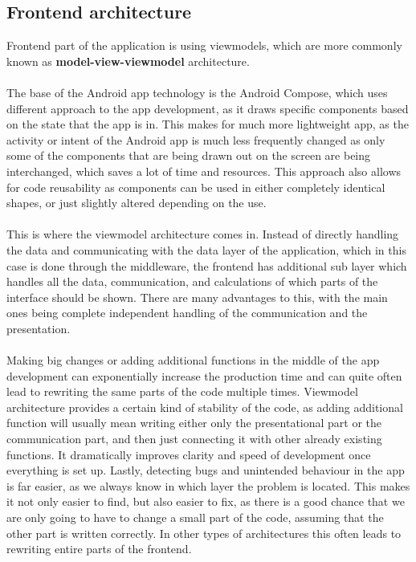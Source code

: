\subsection{Frontend architecture}
\hspace{\parindent}Frontend part of the application is using viewmodels, which are more commonly known as \textbf{model-view-viewmodel} architecture.\\ \\
The base of the Android app technology is the Android Compose, which uses different approach to the app development, as it draws specific components based on the state that the app is in. This makes for much more lightweight app, as the activity or intent of the Android app is much less frequently changed as only some of the components that are being drawn out on the screen are being interchanged, which saves a lot of time and resources. This approach also allows for code reusability as components can be used in either completely identical shapes, or just slightly altered depending on the use.\\ \\
This is where the viewmodel architecture comes in. Instead of directly handling the data and communicating with the data layer of the application, which in this case is done through the middleware, the frontend has additional sub layer which handles all the data, communication, and calculations of which parts of the interface should be shown. There are many advantages to this, with the main ones being complete independent handling of the communication and the presentation.\\ \\
Making big changes or adding additional functions in the middle of the app development can exponentially increase the production time and can quite often lead to rewriting the same parts of the code multiple times. Viewmodel architecture provides a certain kind of stability of the code, as adding additional function will usually mean writing either only the presentational part or the communication part, and then just connecting it with other already existing functions. It dramatically improves clarity and speed of development once everything is set up. Lastly, detecting bugs and unintended behaviour in the app is far easier, as we always know in which layer the problem is located. This makes it not only easier to find, but also easier to fix, as there is a good chance that we are only going to have to change a small part of the code, assuming that the other part is written correctly. In other types of architectures this often leads to rewriting entire parts of the frontend.\\ \\
